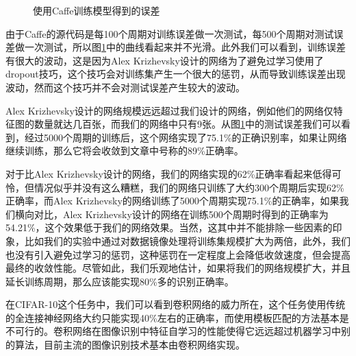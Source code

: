 \begin{figure}[htbp]
\centering
\subfigure{}\addtocounter{subfigure}{-2}
\subfigure{}\addtocounter{subfigure}{-2}
\caption{使用Caffe训练模型得到的误差}
\vspace{-1em}
\label{img:caffeError}
\end{figure}

由于Caffe的源代码是每100个周期对训练误差做一次测试，每500个周期对测试误差做一次测试，所以图\ref{img:caffeError}中的曲线看起来并不光滑。此外我们可以看到，训练误差有很大的波动，这是因为Alex Krizhevsky设计的网络为了避免过学习使用了dropout技巧，这个技巧会对训练集产生一个很大的惩罚，从而导致训练误差出现波动，然而这个技巧并不会对测试误差产生较大的波动。

Alex Krizhevsky设计的网络规模远远超过我们设计的网络，例如他们的网络仅特征图的数量就达几百张，而我们的网络中只有9张。从图\ref{img:caffeError}中的测试误差我们可以看到，经过5000个周期的训练后，这个网络实现了75.1\%的正确识别率，如果让网络继续训练，那么它将会收敛到文章\cite{krizhevsky2012imagenet}中号称的89\%正确率。

对于比Alex Krizhevsky设计的网络，我们的网络实现的62\%正确率看起来低得可怜，但情况似乎并没有这么糟糕，我们的网络只训练了大约300个周期后实现62\%正确率，而Alex Krizhevsky的网络训练了5000个周期实现75.1\%的正确率，如果我们横向对比，Alex Krizhevsky设计的网络在训练500个周期时得到的正确率为54.21\%，这个效果低于我们的网络效果。当然，这其中并不能排除一些因素的印象，比如我们的实验中通过对数据镜像处理将训练集规模扩大为两倍，此外，我们也没有引入避免过学习的惩罚，这种惩罚在一定程度上会降低收敛速度，但会提高最终的收敛性能。尽管如此，我们乐观地估计，如果将我们的网络规模扩大，并且延长训练周期，那么应该能实现80\%多的识别正确率。

在CIFAR-10这个任务中，我们可以看到卷积网络的威力所在，这个任务使用传统的全连接神经网络大约只能实现40\%左右的正确率，而使用模板匹配的方法基本是不可行的。卷积网络在图像识别中特征自学习的性能使得它远远超过机器学习中别的算法，目前主流的图像识别技术基本由卷积网络实现。

